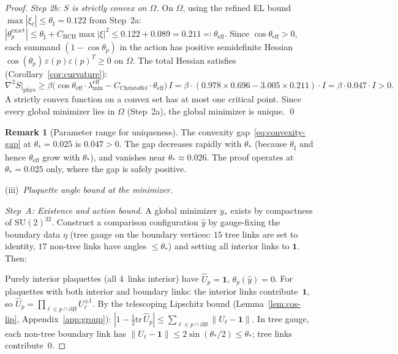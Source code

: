 \documentclass[11pt]{article}
\theoremstyle{definition}
\newtheorem{remark}[theorem]{Remark}
\newcommand{\SU}{\mathrm{SU}}
\newcommand{\tr}{\mathrm{tr}}
\begin{document}
\begin{proof}
\emph{Step 2b: $S$ is strictly convex on $\Omega$.}
On $\Omega$, using the refined EL bound $\max|\xi_\ell|
\le\theta_\sharp=0.122$ from Step~2a:
$|\theta_p^{\mathrm{exact}}|\le\theta_\sharp
+C_{\mathrm{BCH}}\max|\xi|^2
\le 0.122+0.089=0.211\eqqcolon\theta_{\mathrm{eff}}$.
Since $\cos\theta_{\mathrm{eff}}>0$, each summand
$(1-\cos\theta_p)$ in the action has positive semidefinite
Hessian $\cos(\theta_p)\,\varepsilon(p)\varepsilon(p)^T\ge 0$
on $\Omega$.  The total Hessian satisfies
(Corollary~\ref{cor:curvature}):
\begin{equation}\label{eq:convexity-gap}
\nabla^2 S|_{\mathrm{phys}}
\ge\beta\bigl(\cos\theta_{\mathrm{eff}}\cdot\lambda_{\min}^{\mathrm{eff}}
-C_{\mathrm{Christoffel}}\cdot\theta_{\mathrm{eff}}\bigr)\,I
=\beta\cdot(0.978\times 0.696-3.005\times 0.211)\cdot I
=\beta\cdot 0.047\cdot I>0.
\end{equation}
A strictly convex function on a convex set has at most
one critical point.  Since every global minimizer lies
in $\Omega$ (Step~2a), the global minimizer is unique.
\qed

\begin{remark}[Parameter range for uniqueness]
The convexity gap~\eqref{eq:convexity-gap} at
$\theta_*=0.025$ is $0.047>0$.  The gap decreases
rapidly with $\theta_*$ (because $\theta_\sharp$ and hence
$\theta_{\mathrm{eff}}$ grow with $\theta_*$), and
vanishes near $\theta_*\approx 0.026$.  The proof operates
at $\theta_*=0.025$ only, where the gap is safely positive.
\end{remark}

(iii)~\emph{Plaquette angle bound at the minimizer.}

\emph{Step~A: Existence and action bound.}
A global minimizer $y_*$ exists by compactness of $\SU(2)^{32}$.
Construct a comparison configuration $\hat{y}$ by gauge-fixing
the boundary data $\eta$ (tree gauge on the boundary vertices:
$15$ tree links are set to identity, $17$ non-tree links
have angles $\le\theta_*$) and setting all interior links to
$\mathbf{1}$.  Then:

Purely interior plaquettes (all 4~links interior) have
$\hat{U}_p=\mathbf{1}$, $\theta_p(\hat{y})=0$.
For plaquettes with both interior and boundary links: the
interior links contribute~$\mathbf{1}$, so
$\hat{U}_p=\prod_{\ell\in p\cap\partial B}U_\ell^{\pm 1}$.
By the telescoping Lipschitz bound (Lemma~\ref{lem:cos-lip},
Appendix~\ref{app:group}): $|1-\frac{1}{2}\tr\,\hat{U}_p|
\le\sum_{\ell\in p\cap\partial B}\|U_\ell-\mathbf{1}\|$.
In tree gauge, each non-tree boundary link has
$\|U_\ell-\mathbf{1}\|\le 2\sin(\theta_*/2)\le\theta_*$;
tree links contribute~$0$.


\end{proof}
\end{document}
